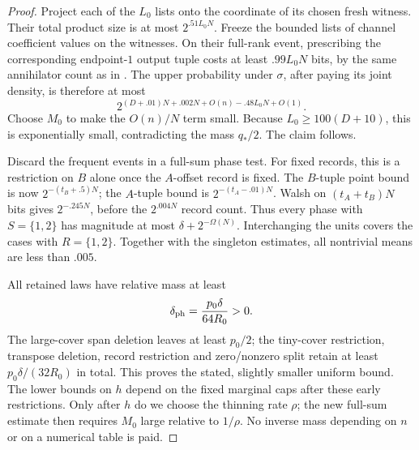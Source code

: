 \begin{proof}
Project each of the \(L_0\) lists onto the coordinate of its
chosen fresh witness.  Their total product size is at most
\(2^{.51L_0N}\).  Freeze the bounded lists of channel
coefficient values on the witnesses.  On their full-rank
event, prescribing the corresponding endpoint-\(1\) output
tuple costs at least \(.99L_0N\) bits, by the same annihilator
count as in .  The upper
probability under \(\sigma\), after paying its joint density,
is therefore at most
\[
 2^{(D+.01)N+.002N+O(n)-.48L_0N+O(1)}.
\]
Choose \(M_0\) to make the \(O(n)/N\) term small.
Because \(L_0\ge100(D+10)\), this is exponentially small,
contradicting the mass \(q_*/2\).  The claim follows.

Discard the frequent events in a full-sum phase test.
For fixed records, this is a restriction on \(B\) alone once
the \(A\)-offset record is fixed.  The \(B\)-tuple point bound
is now \(2^{-(t_B+.5)N}\); the \(A\)-tuple bound is
\(2^{-(t_A-.01)N}\).  Walsh on \((t_A+t_B)N\) bits gives
\(2^{-.245N}\), before the \(2^{.004N}\) record count.
Thus every phase with \(S=\{1,2\}\) has magnitude at most
\(\delta+2^{-\Omega(N)}\).  Interchanging the units covers
the cases with \(R=\{1,2\}\).  Together with the singleton
estimates, all nontrivial means are less than \(.005\).

All retained laws have relative mass at least
\begin{equation}
 \delta_{\rm ph}=\frac{p_0\delta}{64R_0}>0.
 \label{eq:tp-phase-retained-mass}
\end{equation}
The large-cover span deletion leaves at least \(p_0/2\);
the tiny-cover restriction, transpose deletion, record restriction
and zero/nonzero split retain at least
\(p_0\delta/(32R_0)\) in total.  This proves the stated, slightly
smaller uniform bound.  The lower bounds on \(h\) depend on the
fixed marginal caps after these early restrictions.  Only after
\(h\) do we choose the thinning rate \(\rho\); the new full-sum
estimate then requires \(M_0\) large relative to \(1/\rho\).
No inverse mass depending on \(n\) or on a numerical table is paid.
\end{proof}

